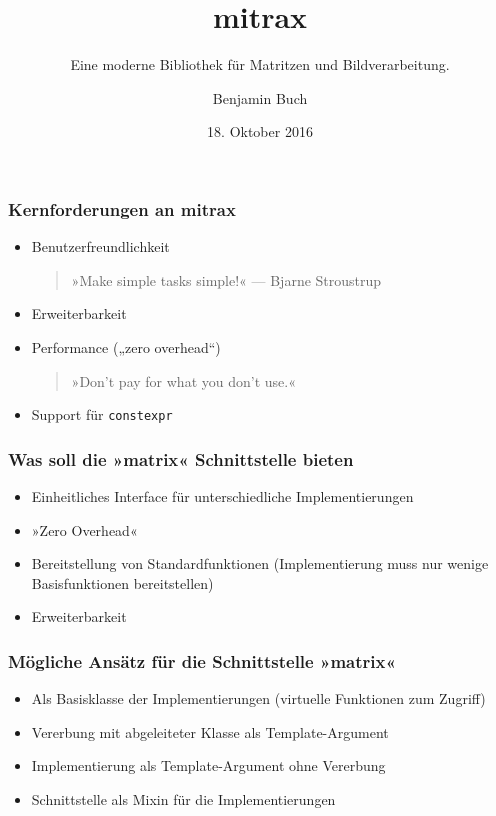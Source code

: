 \documentclass{beamer}
\title{mitrax}
\author{Benjamin Buch}
\date{18. Oktober 2016}
\subtitle{Eine moderne Bibliothek für Matritzen und Bildverarbeitung.}
\begin{document}
    \maketitle
\begin{frame}
    \frametitle{Kernforderungen an mitrax}
    \begin{itemize}
        \item Benutzerfreundlichkeit\\
        \begin{quote}»Make simple tasks simple!« \hspace{1em} — Bjarne Stroustrup\end{quote}
        \item Erweiterbarkeit\\
        \hspace{1em}
        \item Performance („zero overhead“)\\
        \begin{quote}»Don’t pay for what you don’t use.«\end{quote}
        \item Support für \texttt{constexpr}\\
        \hspace{1em}
    \end{itemize}
\end{frame}
\begin{frame}
    \frametitle{Was soll die »matrix« Schnittstelle bieten}
    \begin{itemize}
        \item Einheitliches Interface für unterschiedliche Implementierungen
        \item »Zero Overhead«
        \item Bereitstellung von Standardfunktionen (Implementierung muss nur wenige Basisfunktionen bereitstellen)
        \item Erweiterbarkeit
    \end{itemize}
\end{frame}
\begin{frame}
    \frametitle{Mögliche Ansätz für die Schnittstelle »matrix«}
    \begin{itemize}
        \item Als Basisklasse der Implementierungen (virtuelle Funktionen zum Zugriff)
        \item Vererbung mit abgeleiteter Klasse als Template-Argument
        \item Implementierung als Template-Argument ohne Vererbung
        \item Schnittstelle als Mixin für die Implementierungen
    \end{itemize}
\end{frame}
\end{document}
